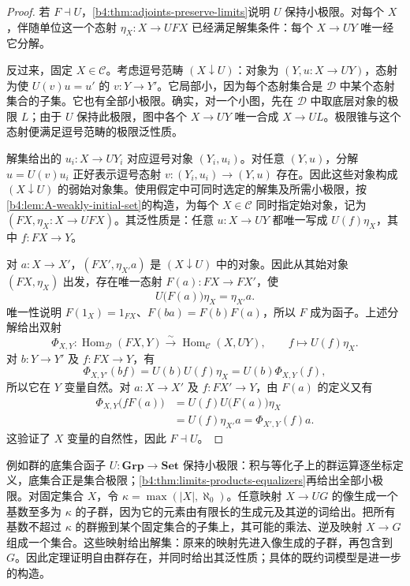 \begin{proof}
	若 \(F\dashv U\)，\cref{b4:thm:adjoints-preserve-limits}说明 \(U\) 保持小极限。对每个 \(X\)，伴随单位这一个态射 \(\eta_X:X\to UFX\) 已经满足解集条件：每个 \(X\to UY\) 唯一经它分解。

	反过来，固定 \(X\in\mathcal C\)。考虑逗号范畴 \((X\downarrow U)\)：对象为 \((Y,u:X\to UY)\)，态射为使 \(U(v)u=u'\) 的 \(v:Y\to Y'\)。它局部小，因为每个态射集合是 \(\mathcal D\) 中某个态射集合的子集。它也有全部小极限。确实，对一个小图，先在 \(\mathcal D\) 中取底层对象的极限 \(L\)；由于 \(U\) 保持此极限，图中各个 \(X\to UY\) 唯一合成 \(X\to UL\)。极限锥与这个态射便满足逗号范畴的极限泛性质。

	解集给出的 \(u_i:X\to UY_i\) 对应逗号对象 \((Y_i,u_i)\)。对任意 \((Y,u)\)，分解 \(u=U(v)u_i\) 正好表示逗号态射 \(v:(Y_i,u_i)\to(Y,u)\) 存在。因此这些对象构成 \((X\downarrow U)\) 的弱始对象集。使用假定中可同时选定的解集及所需小极限，按\cref{b4:lem:A-weakly-initial-set}的构造，为每个 \(X\in\mathcal C\) 同时指定始对象，记为 \((FX,\eta_X:X\to UFX)\)。其泛性质是：任意 \(u:X\to UY\) 都唯一写成 \(U(f)\eta_X\)，其中 \(f:FX\to Y\)。

	对 \(a:X\to X'\)，\((FX',\eta_{X'}a)\) 是 \((X\downarrow U)\) 中的对象。因此从其始对象 \((FX,\eta_X)\) 出发，存在唯一态射 \(F(a):FX\to FX'\)，使
	\[
		U\bigl(F(a)\bigr)\eta_X=\eta_{X'}a.
	\]
	唯一性说明 \(F(1_X)=1_{FX}\)、\(F(ba)=F(b)F(a)\)，所以 \(F\) 成为函子。上述分解给出双射
	\[
		\Phi_{X,Y}:\operatorname{Hom}_{\mathcal D}(FX,Y) \xrightarrow{\sim}\operatorname{Hom}_{\mathcal C}(X,UY), \qquad f\longmapsto U(f)\eta_X.
	\]
	对 \(b:Y\to Y'\) 及 \(f:FX\to Y\)，有
	\[
		\Phi_{X,Y'}(bf)=U(b)U(f)\eta_X =U(b)\Phi_{X,Y}(f),
	\]
	所以它在 \(Y\) 变量自然。对 \(a:X\to X'\) 及 \(f:FX'\to Y\)，由 \(F(a)\) 的定义又有
	\[
		\begin{aligned}
			\Phi_{X,Y}\bigl(fF(a)\bigr) &=U(f)U\bigl(F(a)\bigr)\eta_X\\
			&=U(f)\eta_{X'}a =\Phi_{X',Y}(f)a.
		\end{aligned}
	\]
	这验证了 \(X\) 变量的自然性，因此 \(F\dashv U\)。
\end{proof}

例如群的底集合函子 \(U:\mathbf{Grp}\to\mathbf{Set}\) 保持小极限：积与等化子上的群运算逐坐标定义，底集合正是集合极限；\cref{b4:thm:limits-products-equalizers}再给出全部小极限。对固定集合 \(X\)，令 \(\kappa=\max(|X|,\aleph_0)\)。任意映射 \(X\to UG\) 的像生成一个基数至多为 \(\kappa\) 的子群，因为它的元素由有限长的生成元及其逆的词给出。把所有基数不超过 \(\kappa\) 的群搬到某个固定集合的子集上，其可能的乘法、逆及映射 \(X\to G\) 组成一个集合。这些映射给出解集：原来的映射先进入像生成的子群，再包含到 \(G\)。因此定理证明自由群存在，并同时给出其泛性质；具体的既约词模型是进一步的构造。

